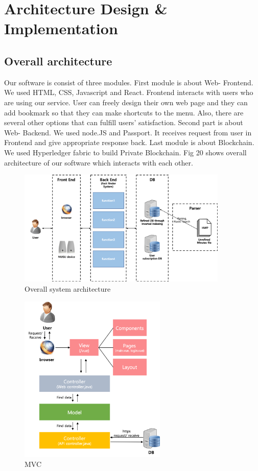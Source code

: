 \documentclass[conference]{IEEEtran}
\begin{document}
\section{Architecture Design \& Implementation}
\subsection{Overall architecture}
Our software is consist of three modules. First module is about Web- Frontend. We used HTML, CSS, Javascript and React. Frontend interacts with users who are using our service. User can freely design their own web page and they can add bookmark so that they can make shortcuts to the menu. Also, there are several other options that can fulfill users’ satisfaction. Second part is about Web- Backend. We used node.JS and Passport. It receives request from user in Frontend and give appropriate response back. Last module is about Blockchain. We used Hyperledger fabric to build Private Blockchain. Fig 20 shows overall architecture of our software which interacts with each other.\\

\begin{figure}[htbp]
	\centerline{\includegraphics[width=100mm,scale=0.5]{fig/6_1.png}}
	\caption{Overall system architecture}
	\label{fig}
	\end{figure}
	
\begin{figure}[htbp]
	\centerline{\includegraphics[width=70mm,scale=0.5]{fig/6_2.png}}
	\caption{MVC}
	\label{fig}
	\end{figure}
\end{document}
